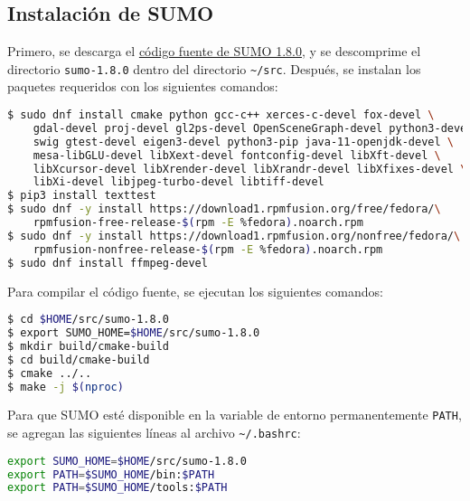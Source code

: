 
\subsection{Instalación de SUMO}

\label{subsec:instalacion_sumo}

Primero, se descarga el
\href{https://sourceforge.net/projects/sumo/files/sumo/}{código fuente de SUMO
1.8.0}, y se descomprime el directorio {\lstinline[language=bash]!sumo-1.8.0!}
dentro del directorio {\lstinline[language=bash]!~/src!}. Después, se instalan
los paquetes requeridos con los siguientes comandos:

\begin{lstlisting}[language=bash]
$ sudo dnf install cmake python gcc-c++ xerces-c-devel fox-devel \
    gdal-devel proj-devel gl2ps-devel OpenSceneGraph-devel python3-devel \
    swig gtest-devel eigen3-devel python3-pip java-11-openjdk-devel \
    mesa-libGLU-devel libXext-devel fontconfig-devel libXft-devel \
    libXcursor-devel libXrender-devel libXrandr-devel libXfixes-devel \
    libXi-devel libjpeg-turbo-devel libtiff-devel
$ pip3 install texttest
$ sudo dnf -y install https://download1.rpmfusion.org/free/fedora/\
    rpmfusion-free-release-$(rpm -E %fedora).noarch.rpm
$ sudo dnf -y install https://download1.rpmfusion.org/nonfree/fedora/\
    rpmfusion-nonfree-release-$(rpm -E %fedora).noarch.rpm
$ sudo dnf install ffmpeg-devel
\end{lstlisting}

Para compilar el código fuente, se ejecutan los siguientes comandos:

\begin{lstlisting}[language=bash]
$ cd $HOME/src/sumo-1.8.0
$ export SUMO_HOME=$HOME/src/sumo-1.8.0
$ mkdir build/cmake-build
$ cd build/cmake-build
$ cmake ../..
$ make -j $(nproc)
\end{lstlisting}

Para que SUMO esté disponible en la variable de entorno permanentemente
{\lstinline[language=bash]!PATH!}, se agregan las siguientes líneas al archivo
{\lstinline[language=bash]!~/.bashrc!}:

\begin{lstlisting}[language=bash]
export SUMO_HOME=$HOME/src/sumo-1.8.0
export PATH=$SUMO_HOME/bin:$PATH
export PATH=$SUMO_HOME/tools:$PATH
\end{lstlisting}

